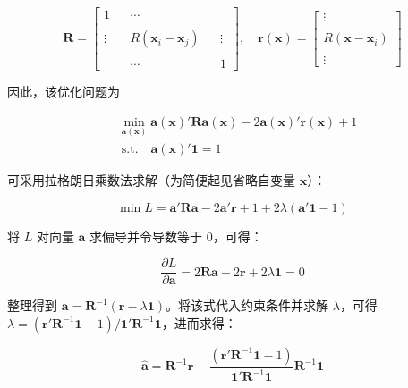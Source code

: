 \documentclass{ctexart}
\begin{document}
\begin{equation*}
\boldsymbol{R}=
\begin{bmatrix}
1&&\cdots&&\\\\
\vdots&&R(\boldsymbol{x}_{i}-\boldsymbol{x}_{j})&&\vdots\\\\
&&\cdots&& 1
\end{bmatrix},\quad\boldsymbol{r}(\boldsymbol{x})=\begin{bmatrix}
\vdots\\\\R(\boldsymbol{x}-\boldsymbol{x}_i)\\\\\vdots
\end{bmatrix}
\tag{2.13}
\end{equation*}

因此，该优化问题为

\begin{align*}
&\min_{\boldsymbol{a}(\boldsymbol{x})}\boldsymbol{a}(\boldsymbol{x})'\boldsymbol{R}\boldsymbol{a}(\boldsymbol{x})-2\boldsymbol{a}(\boldsymbol{x})'\boldsymbol{r}(\boldsymbol{x})+1\\
&\;\text{s.t.}\quad\boldsymbol{a}(\boldsymbol{x})'\boldsymbol{1}=1
\end{align*}

可采用拉格朗日乘数法求解（为简便起见省略自变量 $\boldsymbol{x}$）：

\begin{equation*}
\min L=\boldsymbol{a}'\boldsymbol{R}\boldsymbol{a}-2\boldsymbol{a}'\boldsymbol{r}+1+2\lambda(\boldsymbol{a}'\boldsymbol{1}-1)
\end{equation*}

将 $L$ 对向量 $\boldsymbol{a}$ 求偏导并令导数等于 0，可得：

\begin{equation*}
\frac{\partial L}{\partial\boldsymbol{a}}=2\boldsymbol{R}\boldsymbol{a}-2\boldsymbol{r}+2\lambda\boldsymbol{1}=0
\end{equation*}

整理得到 $\boldsymbol{a}=\boldsymbol{R}^{-1}(\boldsymbol{r}-\lambda\boldsymbol{1})$。将该式代入约束条件并求解 $\lambda$，可得 $\lambda=(\boldsymbol{r}'\boldsymbol{R}^{-1}\boldsymbol{1}-1)/\boldsymbol{1}'\boldsymbol{R}^{-1}\boldsymbol{1}$，进而求得：

\begin{equation*}
\widehat{\boldsymbol{a}}=\boldsymbol{R}^{-1}\boldsymbol{r}-\frac{(\boldsymbol{r}'\boldsymbol{R}^{-1}\boldsymbol{1}-1)}{\boldsymbol{1}'\boldsymbol{R}^{-1}\boldsymbol{1}}\boldsymbol{R}^{-1}\boldsymbol{1}
\end{equation*}
\end{document}
